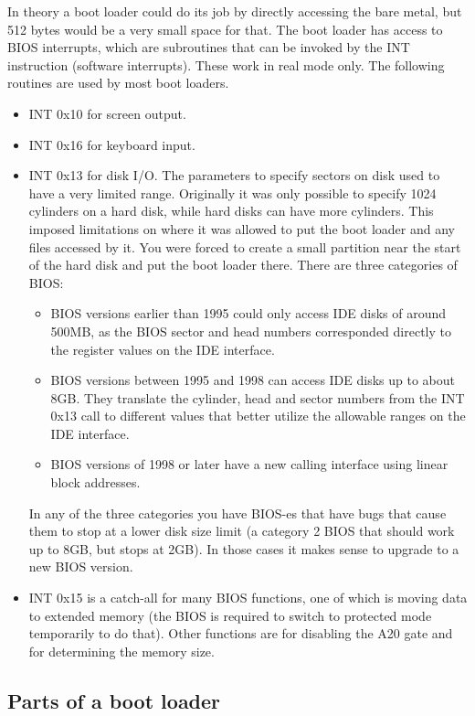 \documentclass[12pt,a4paper]{article}
\begin{document}
In theory a boot loader could do its job by directly accessing the
bare metal, but 512 bytes would be a very small space for that.
The boot loader has access to BIOS interrupts, which are subroutines
that can be invoked by the INT instruction (software
interrupts). These work in real mode only. The following routines are
used by most boot loaders.
\begin{itemize}
\item INT 0x10 for screen output.
\item INT 0x16 for keyboard input.
\item INT 0x13 for disk I/O. The parameters to specify sectors on disk
  used to have a very limited range. Originally it was only possible
  to specify 1024 cylinders on a hard disk, while hard disks can have
  more cylinders. This imposed limitations on where it was allowed to
  put the boot loader and any files accessed by it. You were forced to
  create a small partition near the start of the hard disk and put the
  boot loader there. There are three categories of BIOS:
  \begin{itemize}
  \item BIOS versions earlier than 1995 could only access IDE disks of
  around 500MB, as the BIOS sector and head numbers corresponded
  directly to the register values on the IDE interface.
  \item BIOS versions between 1995 and 1998 can access IDE disks up to
  about 8GB. They translate the cylinder, head and sector numbers from
  the INT 0x13 call to different values that better utilize the
  allowable ranges on the IDE interface. 
  \item BIOS versions of 1998 or later have a new calling interface
  using linear block addresses. 
  \end{itemize}
  In any of the three categories you have BIOS-es that have bugs that
  cause them to stop at a lower disk size limit (a category 2 BIOS
  that should work up to 8GB, but stops at 2GB). In those cases it
  makes sense to upgrade to a new BIOS version.
\item INT 0x15 is a catch-all for many BIOS functions, one of which
  is moving data to extended memory (the BIOS is required to switch to
  protected mode temporarily to do that). Other functions are for disabling
  the A20 gate and for determining the memory size.
\end{itemize}

\subsection{Parts of a boot loader}
\end{document}
